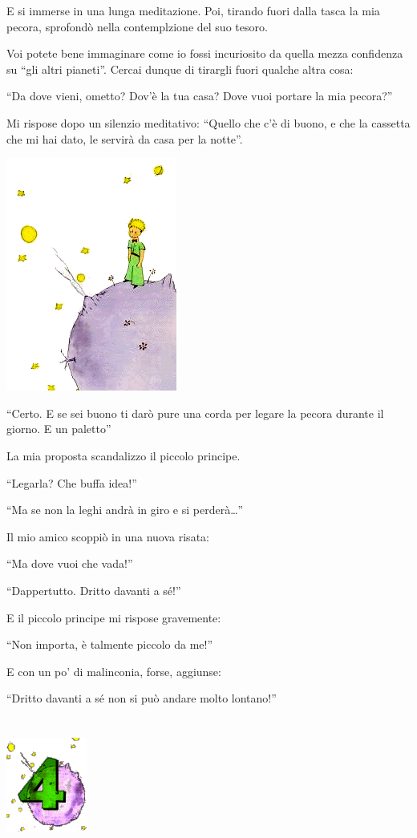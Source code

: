 \documentclass[11pt]{scrbook}
\begin{document}
E si immerse in una lunga meditazione. Poi, tirando fuori dalla tasca la mia pecora, sprofondò nella contemplzione del suo tesoro.

Voi potete bene immaginare come io fossi incuriosito da quella mezza confidenza su ``gli altri pianeti''. Cercai dunque di tirargli fuori qualche altra cosa:

``Da dove vieni, ometto? Dov'è la tua casa? Dove vuoi portare la mia pecora?''

Mi rispose dopo un silenzio meditativo: ``Quello che c'è di buono, e che la cassetta che mi hai dato, le servirà da casa per la notte''.

\begin{center}
\includegraphics{img/estrellas}
\end{center}

``Certo. E se sei buono ti darò pure una corda per legare la pecora durante il giorno. E un paletto''

La mia proposta scandalizzo il piccolo principe.

``Legarla? Che buffa idea!''

``Ma se non la leghi andrà in giro e si perderà\ldots{}''

Il mio amico scoppiò in una nuova risata:

``Ma dove vuoi che vada!''

``Dappertutto. Dritto davanti a sé!''

E il piccolo principe mi rispose gravemente:

``Non importa, è talmente piccolo da me!''

E con un po' di malinconia, forse, aggiunse:

``Dritto davanti a sé non si può andare molto lontano!''

\chapter{}
\begin{center}
\includegraphics{img/chapter4}
\end{center}
\end{document}
